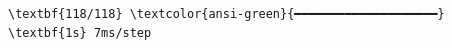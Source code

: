 \documentclass[11pt]{article}
\begin{document}
    \begin{center}
    \end{center}
    { \hspace*{\fill} \\}
    
    \begin{Verbatim}[commandchars=\\\{\}]
\textbf{118/118} \textcolor{ansi-green}{━━━━━━━━━━━━━━━━━━━━} \textbf{1s} 7ms/step
    \end{Verbatim}

    \begin{center}
    \end{center}
    { \hspace*{\fill} \\}
    
    \begin{center}
    \end{center}
    { \hspace*{\fill} \\}
    
    \begin{center}
    \end{center}
    { \hspace*{\fill} \\}
    
\end{document}
